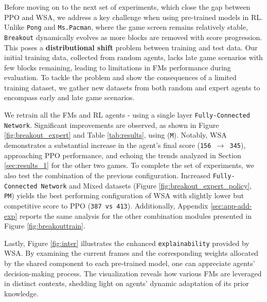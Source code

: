 Before moving on to the next set of experiments, which close the gap between PPO and WSA, we address a key challenge when using pre-trained models in RL. Unlike \texttt{Pong} and \texttt{Ms.Pacman}, where the game screen remains relatively stable, \texttt{Breakout} dynamically evolves as more blocks are removed with score progression. This poses a \textbf{distributional shift} problem between training and test data. Our initial training data, collected from random agents, lacks late game scenarios with few blocks remaining, leading to limitations in FMs performance during evaluation. To tackle the problem and show the consequences of a limited training dataset, we gather new datasets from both random and expert agents to encompass early and late game scenarios.

We retrain all the FMs and RL agents - using a single layer \texttt{Fully-Connected Network}. Significant improvements are observed, as shown in Figure \ref{fig:breakout_expert} and Table \ref{tab:results}, using (\texttt{M}). Notably, WSA demonstrates a substantial increase in the agent's final score (\texttt{156 $\rightarrow$ 345}), approaching PPO performance, and echoing the trends analyzed in Section \ref{sec:results_1} for the other two games. To complete the set of experiments, we also test the combination of the previous configuration. Increased \texttt{Fully-Connected Network} and Mixed datasets (Figure \ref{fig:breakout_expert_policy}, \texttt{PM}) yields the best performing configuration of WSA with slightly lower but competitive score to PPO (\texttt{387 vs 413}). Additionally, Appendix \ref{sec:app-add-exp} reports the same analysis for the other combination modules presented in Figure \ref{fig:breakouttrain}.

Lastly, Figure \ref{fig:inter} illustrates the enhanced \texttt{explainability} provided by WSA. By examining the current frames and the corresponding weights allocated by the shared component to each pre-trained model, one can appreciate agents' decision-making process. The visualization reveals how various FMs are leveraged in distinct contexts, shedding light on agents' dynamic adaptation of its prior knowledge.

